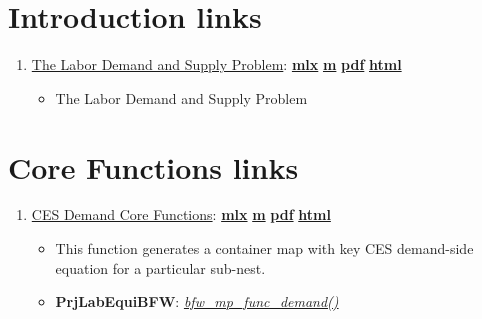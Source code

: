 \documentclass[
]{book}
\providecommand{\tightlist}{%
  \setlength{\itemsep}{0pt}\setlength{\parskip}{0pt}}
\begin{document}
\hypertarget{introduction-links}{%
\section{Introduction links}\label{introduction-links}}

\begin{enumerate}
\def\labelenumi{\arabic{enumi}.}
\tightlist
\item
  \href{https://fanwangecon.github.io/PrjLabEquiBFW/PrjLabEquiBFW/doc/intro/htmlpdfm/bfwx_intro.html}{The Labor Demand and Supply Problem}: \href{https://github.com/FanWangEcon/PrjLabEquiBFW/blob/master/PrjLabEquiBFW/doc/intro/bfwx_intro.mlx}{\textbf{mlx}} \textbar{} \href{https://github.com/FanWangEcon/PrjLabEquiBFW/blob/master/PrjLabEquiBFW/doc/intro/htmlpdfm/bfwx_intro.m}{\textbf{m}} \textbar{} \href{https://github.com/FanWangEcon/PrjLabEquiBFW/blob/master/PrjLabEquiBFW/doc/intro/htmlpdfm/bfwx_intro.pdf}{\textbf{pdf}} \textbar{} \href{https://fanwangecon.github.io/PrjLabEquiBFW/PrjLabEquiBFW/doc/intro/htmlpdfm/bfwx_intro.html}{\textbf{html}}

  \begin{itemize}
  \tightlist
  \item
    The Labor Demand and Supply Problem
  \end{itemize}
\end{enumerate}

\hypertarget{core-functions-links}{%
\section{Core Functions links}\label{core-functions-links}}

\begin{enumerate}
\def\labelenumi{\arabic{enumi}.}
\tightlist
\item
  \href{https://fanwangecon.github.io/PrjLabEquiBFW/PrjLabEquiBFW/doc/func/htmlpdfm/bfwx_mp_func_demand.html}{CES Demand Core Functions}: \href{https://github.com/FanWangEcon/PrjLabEquiBFW/blob/master/PrjLabEquiBFW/doc/func/bfwx_mp_func_demand.mlx}{\textbf{mlx}} \textbar{} \href{https://github.com/FanWangEcon/PrjLabEquiBFW/blob/master/PrjLabEquiBFW/doc/func/htmlpdfm/bfwx_mp_func_demand.m}{\textbf{m}} \textbar{} \href{https://github.com/FanWangEcon/PrjLabEquiBFW/blob/master/PrjLabEquiBFW/doc/func/htmlpdfm/bfwx_mp_func_demand.pdf}{\textbf{pdf}} \textbar{} \href{https://fanwangecon.github.io/PrjLabEquiBFW/PrjLabEquiBFW/doc/func/htmlpdfm/bfwx_mp_func_demand.html}{\textbf{html}}

  \begin{itemize}
  \tightlist
  \item
    This function generates a container map with key CES demand-side equation for a particular sub-nest.
  \item
    \textbf{PrjLabEquiBFW}: \emph{\href{https://github.com/FanWangEcon/PrjLabEquiBFW/blob/main/PrjLabEquiBFW/func/bfw_mp_func_demand.m}{bfw\_mp\_func\_demand()}}
  \end{itemize}
\end{enumerate}
\end{document}

